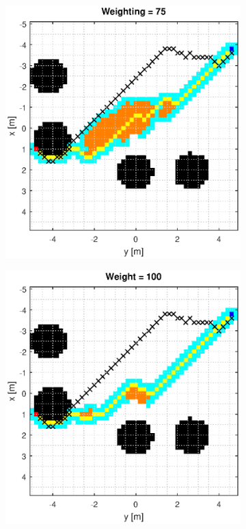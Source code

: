 \documentclass[Space3_Assign3.tex]{subfile}
\begin{document}
\begin{figure}
\begin{subfigure}{0.49\linewidth}
\end{subfigure}
\begin{subfigure}{0.49\linewidth}
\includegraphics[width = 1\linewidth]{Astar_euc_75.eps}
\end{subfigure}
\begin{subfigure}{0.49\linewidth}
\includegraphics[width = 1\linewidth]{Astar_euc_100.eps}
\end{subfigure}
\end{figure}
\end{document}
